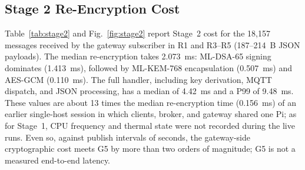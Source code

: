 \documentclass[journal]{IEEEtran}
\begin{document}
\begin{table}[!t]
\centering
\caption{Connection-Level Block Rate by Attack Family (IPS Mode, $K = 2$, Mean Over Four Runs). Detected = Share of Labelled Connections With at Least One Attack Verdict; Blocked = Share for Which a Block Was Applied. ``Held'' = the Broker Socket Was Still Open After the Miss}
\label{tab:ips-block}
\footnotesize
\setlength{\tabcolsep}{3pt}
\end{table}

\subsection{Stage 2 Re-Encryption Cost}
\label{sec:res-pqc}

Table~\ref{tab:stage2} and Fig.~\ref{fig:stage2} report Stage~2 cost for the 18,157 messages received by the gateway subscriber in R1 and R3--R5 (187--214~B JSON payloads). The median re-encryption takes 2.073~ms: ML-DSA-65 signing dominates (1.413~ms), followed by ML-KEM-768 encapsulation (0.507~ms) and AES-GCM (0.110~ms). The full handler, including key derivation, MQTT dispatch, and JSON processing, has a median of 4.42~ms and a P99 of 9.48~ms. These values are about 13 times the median re-encryption time (0.156~ms) of an earlier single-host session in which clients, broker, and gateway shared one Pi; as for Stage~1, CPU frequency and thermal state were not recorded during the live runs. Even so, against publish intervals of seconds, the gateway-side cryptographic cost meets G5 by more than two orders of magnitude; G5 is not a measured end-to-end latency.
\end{document}
